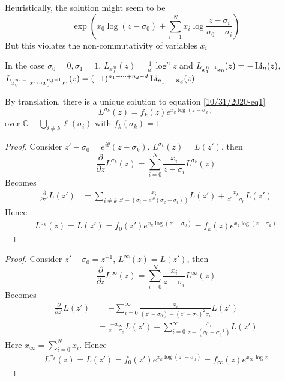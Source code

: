 \documentclass[main]{subfiles}
\begin{document}
\begin{remark}
Heuristically, the solution might seem to be
\[\exp\left({x_0\log(z-\sigma_0)+\sum_{i=1}^Nx_i\log\frac{z-\sigma_i}{\sigma_0-\sigma_i}}\right)\]
But this violates the non-commutativity of variables $x_i$
\end{remark}

\begin{example}
In the case $\sigma_0=0,\sigma_1=1$, $L_{x_0^m}(z)=\frac{1}{n!}\log^nz$ and $L_{x_1^{n-1}x_0}(z)=-\operatorname{Li}_n(z)$, $L_{x_0^{n_1-1}x_{1}\cdots x_0^{n_d-1}x_{1}}(z)=(-1)^{n_1+\cdots+n_d-d}\operatorname{Li}_{n_1,\cdots,n_d}(z)$
\end{example}

\begin{corollary}
By translation, there is a unique solution to equation \eqref{10/31/2020-eq1}
\[L^{\sigma_k}(z)=f_k(z)e^{x_k\log(z-\sigma_k)}\]
over $\mathbb C-\bigcup_{i\neq k}\ell(\sigma_i)$ with $f_k(\sigma_k)=1$
\end{corollary}

\begin{proof}
Consider $z'-\sigma_0=e^{i\theta}(z-\sigma_k)$, $L^{\sigma_k}(z)=L(z')$, then
\[\frac{\partial}{\partial z}L^{\sigma_k}(z)=\sum_{i=0}^N\frac{x_i}{z-\sigma_i}L^{\sigma_k}(z)\]
Becomes
\begin{align*}
\frac{\partial}{\partial z'}L(z')&=\sum_{i\neq k}\frac{x_i}{z'-(\sigma_i-e^{i\theta}(\sigma_k-\sigma_i))}L(z')+\frac{x_k}{z'-\sigma_0}L(z')
\end{align*}
Hence
\begin{align*}
L^{\sigma_k}(z)=L(z')=f_0(z')e^{x_k\log(z'-\sigma_0)}=f_k(z)e^{x_k\log(z-\sigma_k)}
\end{align*}
\end{proof}

\begin{corollary}

\end{corollary}

\begin{proof}
Consider $z'-\sigma_0=z^{-1}$, $L^{\infty}(z)=L(z')$, then
\[\frac{\partial}{\partial z}L^{\infty}(z)=\sum_{i=0}^N\frac{x_i}{z-\sigma_i}L^{\infty}(z)\]
Becomes
\begin{align*}
\frac{\partial}{\partial z'}L(z')&=-\sum_{i=0}^\infty\frac{x_i}{(z'-\sigma_0)-(z'-\sigma_0)^2\sigma_i}L(z') \\
&=\frac{-x_\infty}{z-\sigma_0}L(z')+\sum_{i=0}^\infty\frac{x_i}{z-(\sigma_0+\sigma_i^{-1})}L(z')
\end{align*}
Here $x_\infty=\sum_{i=0}^N x_i$. Hence
\begin{align*}
L^{\sigma_k}(z)=L(z')=f_0(z')e^{x_k\log(z'-\sigma_0)}=f_\infty(z)e^{x_\infty\log z}
\end{align*}
\end{proof}
\end{document}
